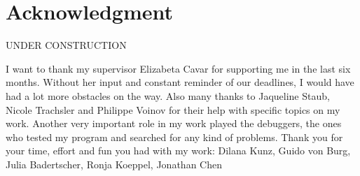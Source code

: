 
\chapter*{Acknowledgment}
UNDER CONSTRUCTION

I want to thank my supervisor Elizabeta Cavar for supporting me in the last six months.
Without her input and constant reminder of our deadlines, I would have had a lot more obstacles on the way.
Also many thanks to Jaqueline Staub, Nicole Trachsler and Philippe Voinov for their help with specific topics on my work.
Another very important role in my work played the debuggers, the ones who tested my program and searched for any kind of problems.
Thank you for your time, effort and fun you had with my work:
Dilana Kunz, Guido von Burg, Julia Badertscher, Ronja Koeppel, Jonathan Chen
